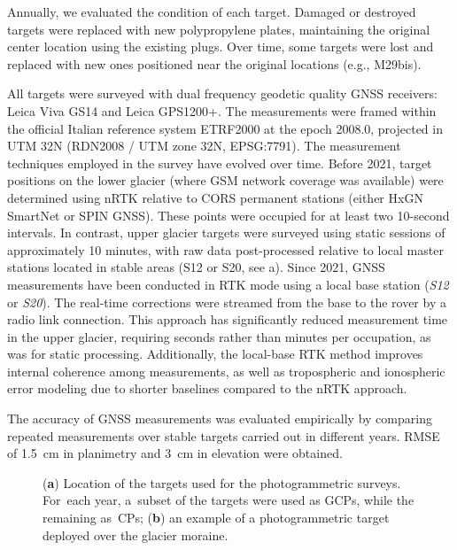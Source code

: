 Annually, we evaluated the condition of each target. Damaged or destroyed targets were replaced with new polypropylene plates, maintaining the original center location using the existing plugs. 
Over time, some targets were lost and replaced with new ones positioned near the original locations (e.g., M29bis).

All targets were surveyed with dual frequency geodetic quality GNSS receivers: 
Leica Viva GS14 and Leica GPS1200+.
The measurements were framed within the official Italian reference system ETRF2000
at the epoch 2008.0, projected in UTM 32N (RDN2008 / UTM zone 32N, EPSG:7791).
The measurement techniques employed in the survey have evolved over time.
Before 2021, target positions on the lower glacier (where GSM network coverage was available) 
were determined using nRTK relative to CORS permanent stations (either HxGN SmartNet or SPIN GNSS).
These points were occupied for at least two 10-second intervals. 
In contrast, upper glacier targets were surveyed using static sessions of approximately 10 
minutes, with raw data post-processed relative to local master stations located in stable areas 
(S12 or S20, see a).
Since 2021, GNSS measurements have been conducted in RTK mode using a local base station 
(\textit{S12} or \textit{S20}).
The real-time corrections were streamed from the base to the rover by a radio link connection. 
This approach has significantly reduced measurement time in the upper glacier, requiring seconds 
rather than minutes per occupation, as was for static processing.
Additionally, the local-base RTK method improves internal coherence among measurements, 
as well as tropospheric and ionospheric error modeling due to shorter baselines compared to 
the nRTK approach.

The accuracy of GNSS measurements was evaluated empirically by comparing repeated
measurements over stable targets carried out in different years.
RMSE of \qty{1.5}{\centi\meter} in planimetry and \qty{3}{\centi\meter} in elevation were
obtained.

\begin{figure}
    \centering
    \caption{(\textbf{a}) Location of the targets used for the
        photogrammetric surveys. For~each year, a~subset of the targets were used as GCPs, while the remaining as~CPs; (\textbf{b}) an example of a photogrammetric target deployed over the glacier moraine.}
    \label{fig:3:belvedereGCP}
\end{figure}

